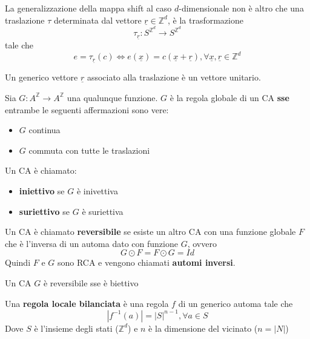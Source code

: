 La generalizzazione della mappa shift al caso $d$-dimensionale non è altro che una
traslazione $\tau$ determinata dal vettore $\underline{r}\in  \mathbb{Z}^d$, è
la trasformazione
$$\tau_{\underline{r}} :  S^{\mathbb{Z}^d} \rightarrow  S^{\mathbb{Z}^d}$$
tale che
$$e =\tau_{\underline{r}}(c) \iff e(\underline{x}) =  c(\underline{x}+\underline{r}), \forall \underline{x},\underline{r}\in \mathbb{Z}^d$$

Un generico vettore $\underline{r}$ associato alla traslazione è un vettore
unitario.

\begin{teorema} 
    Sia $G:A^\mathbb{Z}\rightarrow A^\mathbb{Z}$ una qualunque funzione.
    $G$ è la regola globale di un CA \textbf{sse} entrambe le seguenti affermazioni
    sono vere:
    \begin{itemize}
        \item $G$ continua
        \item $G$ commuta con tutte le traslazioni
    \end{itemize}
\end{teorema}

\begin{definizione} 
    Un CA è chiamato:
    \begin{itemize}
        \item \textbf{iniettivo} se $G$ è inivettiva
        \item \textbf{suriettivo} se $G$ è suriettiva
    \end{itemize}

\end{definizione}


\begin{definizione} 
    Un CA è chiamato \textbf{reversibile} se esiste un altro CA con una funzione
    globale $F$ che è l'inversa di un automa dato con funzione $G$, ovvero
    $$ G\odot F= F\odot G = Id$$
    Quindi $F$ e $G$ sono RCA e vengono chiamati \textbf{automi inversi}.
\end{definizione}

\begin{teorema}
    Un CA $G$ è reversibile sse è biettivo
\end{teorema}

\begin{definizione} 
    Una \textbf{regola locale bilanciata} è una regola $f$ di un generico automa
    tale che
    $$|f^{-1}(a)| = | S | ^{n-1}, \forall a \in S$$
    Dove $S$ è l'insieme degli stati ($\mathbb{Z}^d$) e $n$ è la dimensione del
    vicinato ($n=|N|$)
\end{definizione}

